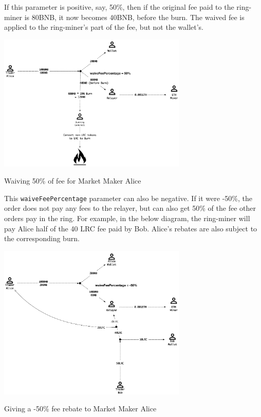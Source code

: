 \documentclass[UTF8,nofonts]{article}
\makeatletter
\newenvironment{figurehere}
 {\def\@captype{figure}}
 {}
\makeatother
\begin{document}
\begin{multicols}{2}
\begin{appendices}
If this parameter is positive, say, 50\%, then if the original fee paid to the ring-miner is 80BNB, it now becomes 40BNB, before the burn. The waived fee is applied to the ring-miner’s part of the fee, but not the wallet’s.

\begin{center}
\begin{figurehere}
\centering
\includegraphics[width=9cm]{6.png}
\caption{Waiving 50\% of fee for Market Maker Alice}
\end{figurehere}
\end{center}

This \verb|waiveFeePercentage| parameter can also be negative. If it were -50\%, the order does not pay any fees to the relayer, but can also get 50\% of the fee other orders pay in the ring. For example, in the below diagram, the ring-miner will pay Alice half of the 40 LRC fee paid by Bob. Alice’s rebates are also subject to the corresponding burn.

\begin{center}
\begin{figurehere}
\centering
\includegraphics[width=9cm]{7.png}
\caption{Giving a -50\% fee rebate to Market Maker Alice}
\end{figurehere}
\end{center}


\end{appendices}
\end{multicols}
\end{document}
